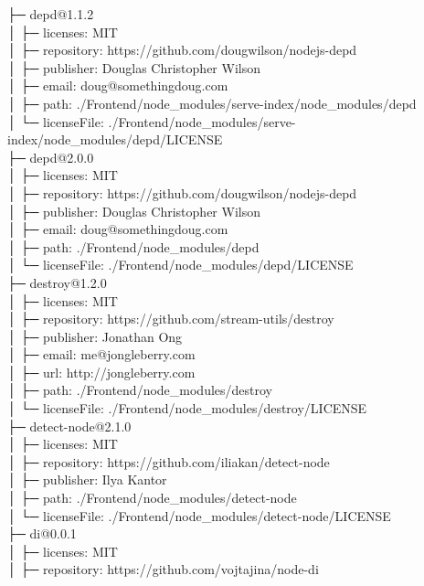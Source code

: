 \documentclass[
    paper=a4,
    twoside=false,
    parskip=half,
    listof=entryprefix,
    listof=totoc,
    index=totoc,
    bibliography=totoc,
    headsepline,
]{scrbook}
\begin{document}
    ├─ depd@1.1.2\\
    │  ├─ licenses: MIT\\
    │  ├─ repository: https://github.com/dougwilson/nodejs-depd\\
    │  ├─ publisher: Douglas Christopher Wilson\\
    │  ├─ email: doug@somethingdoug.com\\
    │  ├─ path: ./Frontend/node\_modules/serve-index/node\_modules/depd\\
    │  └─ licenseFile: ./Frontend/node\_modules/serve-index/node\_modules/depd/LICENSE\\
    ├─ depd@2.0.0\\
    │  ├─ licenses: MIT\\
    │  ├─ repository: https://github.com/dougwilson/nodejs-depd\\
    │  ├─ publisher: Douglas Christopher Wilson\\
    │  ├─ email: doug@somethingdoug.com\\
    │  ├─ path: ./Frontend/node\_modules/depd\\
    │  └─ licenseFile: ./Frontend/node\_modules/depd/LICENSE\\
    ├─ destroy@1.2.0\\
    │  ├─ licenses: MIT\\
    │  ├─ repository: https://github.com/stream-utils/destroy\\
    │  ├─ publisher: Jonathan Ong\\
    │  ├─ email: me@jongleberry.com\\
    │  ├─ url: http://jongleberry.com\\
    │  ├─ path: ./Frontend/node\_modules/destroy\\
    │  └─ licenseFile: ./Frontend/node\_modules/destroy/LICENSE\\
    ├─ detect-node@2.1.0\\
    │  ├─ licenses: MIT\\
    │  ├─ repository: https://github.com/iliakan/detect-node\\
    │  ├─ publisher: Ilya Kantor\\
    │  ├─ path: ./Frontend/node\_modules/detect-node\\
    │  └─ licenseFile: ./Frontend/node\_modules/detect-node/LICENSE\\
    ├─ di@0.0.1\\
    │  ├─ licenses: MIT\\
    │  ├─ repository: https://github.com/vojtajina/node-di\\
\end{document}
